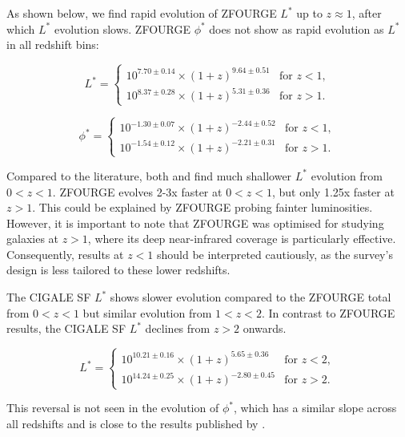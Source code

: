 As shown below, we find rapid evolution of ZFOURGE $L^{*}$ up to $z\approx1$, after which $L^{*}$ evolution slows. ZFOURGE $\phi^{*}$ does not show as rapid evolution as $L^{*}$ in all redshift bins: 

\begin{equation*}
    L^{*} =
    \begin{cases} 
        10^{7.70 \pm 0.14} \times (1+z)^{9.64 \pm 0.51} & \text{for } z < 1, \\
        10^{8.37 \pm 0.28} \times (1+z)^{5.31 \pm 0.36} & \text{for } z > 1.
    \end{cases}
\end{equation*}

\begin{equation*}
    \phi^{*} =
    \begin{cases} 
        10^{-1.30 \pm 0.07} \times (1+z)^{-2.44 \pm 0.52} & \text{for } z < 1, \\
        10^{-1.54 \pm 0.12} \times (1+z)^{-2.21 \pm 0.31} & \text{for } z > 1.
    \end{cases}
\end{equation*}

Compared to the literature, both \cite{gruppioni_herschel_2013} and \cite{magnelli_deepest_2013} find much shallower $L^{*}$ evolution from $0<z<1$. ZFOURGE evolves 2-3x faster at $0<z<1$, but only 1.25x faster at $z>1$. This could be explained by ZFOURGE probing fainter luminosities. However, it is important to note that ZFOURGE was optimised for studying galaxies at $z>1$, where its deep near-infrared coverage is particularly effective. Consequently, results at $z<1$ should be interpreted cautiously, as the survey's design is less tailored to these lower redshifts. 

The CIGALE SF $L^{*}$ shows slower evolution compared to the ZFOURGE total from $0<z<1$ but similar evolution from $1<z<2$. In contrast to ZFOURGE results, the CIGALE SF $L^{*}$ declines from $z>2$ onwards. 

\begin{equation*}
    L^{*} =
    \begin{cases} 
        10^{10.21 \pm 0.16} \times (1+z)^{5.65 \pm 0.36} & \text{for } z < 2, \\
        10^{14.24 \pm 0.25} \times (1+z)^{-2.80 \pm 0.45} & \text{for } z > 2.
    \end{cases}
\end{equation*}

This reversal is not seen in the evolution of $\phi^{*}$, which has a similar slope across all redshifts and is close to the results published by \cite{magnelli_deepest_2013}. 

